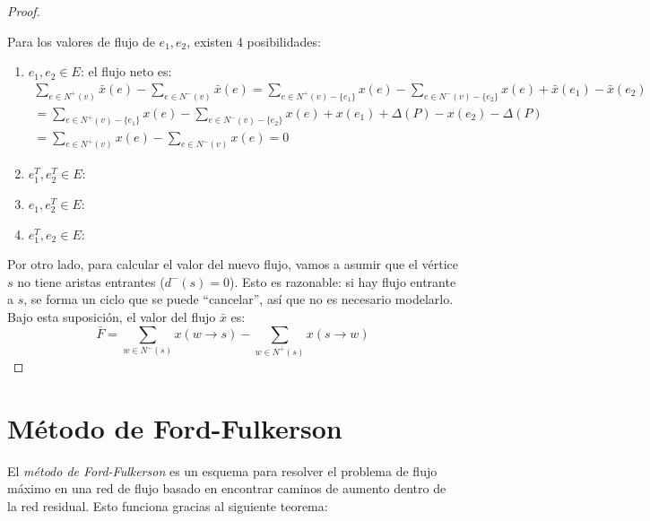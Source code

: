 \documentclass[a4paper]{report}
\begin{document}
\begin{proof}
\begin{itemize}
        Para los valores de flujo de $e_1, e_2$, existen 4 posibilidades:
        \begin{enumerate}
            \item $e_1, e_2 \in E$: el flujo neto es:
                \begin{align*}
                    \sum_{e \in N^+(v)} \bar{x}(e) - \sum_{e \in N^-(v)} \bar{x}(e) = \sum_{e \in N^+(v) - \{e_1\}} x(e) - \sum_{e \in N^-(v) - \{e_2\}} x(e) + \bar{x}(e_1) - \bar{x}(e_2) \\
                    = \sum_{e \in N^+(v) - \{e_1\}} x(e) - \sum_{e \in N^-(v) - \{e_2\}} x(e) + x(e_1) + \Delta(P) - x(e_2) - \Delta(P) \\
                    = \sum_{e \in N^+(v)} x(e) - \sum_{e \in N^-(v)} x(e) = 0
                \end{align*}
            \item $e_1^T, e_2^T \in E$:
            \item $e_1, e_2^T \in E$:
            \item $e_1^T, e_2 \in E$:
        \end{enumerate}
    \end{itemize}

    Por otro lado, para calcular el valor del nuevo flujo, vamos a asumir que el vértice $s$ no tiene aristas entrantes ($d^-(s) = 0$). Esto es razonable: si hay flujo entrante a $s$, se forma un ciclo que se puede ``cancelar'', así que no es necesario modelarlo. Bajo esta suposición, el valor del flujo $\bar{x}$ es:
    $$\bar{F} = \sum_{w \in N^-(s)} x(w \rightarrow s) - \sum_{w \in N^+(s)} x(s \rightarrow w)$$
\end{proof}

\section{Método de Ford-Fulkerson}

El \textit{método de Ford-Fulkerson} es un esquema para resolver el problema de flujo máximo en una red de flujo basado en encontrar caminos de aumento dentro de la red residual. Esto funciona gracias al siguiente teorema:
\end{document}
